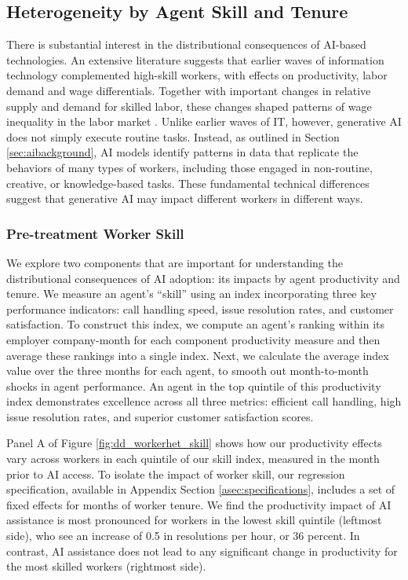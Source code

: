 \documentclass[11pt]{article}
\begin{document}
  

\subsection{Heterogeneity by Agent Skill and Tenure}

There is substantial interest in the distributional consequences of AI-based technologies. An extensive literature suggests that earlier waves of information technology complemented high-skill workers, with effects on productivity, labor demand and wage differentials. Together with important changes in relative supply and demand for skilled labor, these changes shaped patterns of wage inequality in the labor market \citep{katzgoldinorigins1998, katzgoldineducationtech2008}.  Unlike earlier waves of IT, however, generative AI does not simply execute routine tasks. Instead, as outlined in Section \ref{sec:aibackground}, AI models identify patterns in data that replicate the behaviors of many types of workers, including those engaged in non-routine, creative, or knowledge-based tasks.  These fundamental technical differences suggest that generative AI may impact different workers in different ways. 

\subsubsection{Pre-treatment Worker Skill}
We explore two components that are important for understanding the distributional consequences of AI adoption: its impacts by agent productivity and tenure. We measure an agent's ``skill'' using an index incorporating three key performance indicators: call handling speed, issue resolution rates, and customer satisfaction.  To construct this index, we compute an agent's ranking within its employer company-month for each component productivity measure and then average these rankings into a single index.  Next, we calculate the average index value over the three months for each agent, to smooth out month-to-month shocks in agent performance.  An agent in the top quintile of this productivity index demonstrates excellence across all three metrics: efficient call handling, high issue resolution rates, and superior customer satisfaction scores. 

Panel A of Figure \ref{fig:dd_workerhet_skill} shows how our productivity effects vary  across workers in each quintile of our skill index, measured in the month prior to AI access.  To isolate the impact of worker skill, our regression specification, available in Appendix Section \ref{asec:specifications}, includes a set of fixed effects for months of worker tenure. 
We find the productivity impact of AI assistance is most pronounced for workers in the lowest skill quintile (leftmost side), who see an increase of 0.5 in resolutions per hour, or 36 percent. In contrast, AI assistance does not lead to any significant change in productivity for the most skilled workers (rightmost side).
\end{document}
